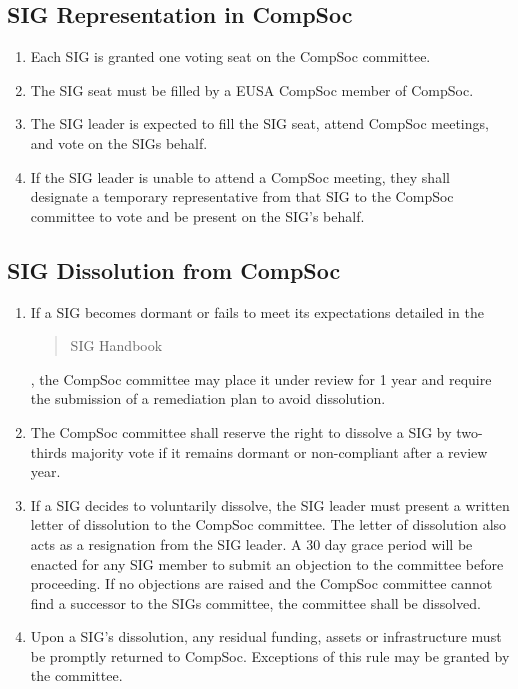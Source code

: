 \subsection{SIG Representation in CompSoc}
\begin{enumerate}
    \item Each SIG is granted one voting seat on the CompSoc committee.
    \item The SIG seat must be filled by a EUSA CompSoc member of CompSoc.
    \item The SIG leader is expected to fill the SIG seat, attend CompSoc meetings, and vote on the SIGs behalf.
    \item If the SIG leader is unable to attend a CompSoc meeting, they shall designate a temporary representative from that SIG to the CompSoc committee to vote and be present on the SIG's behalf.
\end{enumerate}

\subsection{SIG Dissolution from CompSoc}
\begin{enumerate}
    \item If a SIG becomes dormant or fails to meet its expectations detailed in the \blockquote{SIG Handbook}, the CompSoc committee may place it under review for 1 year and require the submission of a remediation plan to avoid dissolution.
    \item The CompSoc committee shall reserve the right to dissolve a SIG by two-thirds majority vote if it remains dormant or non-compliant after a review year.
    \item If a SIG decides to voluntarily dissolve, the SIG leader must present a written letter of dissolution to the CompSoc committee. The letter of dissolution also acts as a resignation from the SIG leader. A 30 day grace period will be enacted for any SIG member to submit an objection to the committee before proceeding. If no objections are raised and the CompSoc committee cannot find a successor to the SIGs committee, the committee shall be dissolved.
    \item Upon a SIG's dissolution, any residual funding, assets or infrastructure must be promptly returned to CompSoc. Exceptions of this rule may be granted by the committee.
\end{enumerate}

